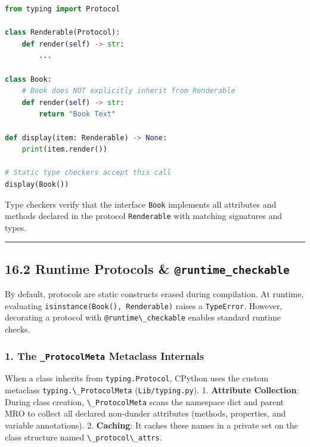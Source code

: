 \begin{lstlisting}[language=Python]
from typing import Protocol

class Renderable(Protocol):
    def render(self) -> str:
        ...

class Book:
    # Book does NOT explicitly inherit from Renderable
    def render(self) -> str:
        return "Book Text"

def display(item: Renderable) -> None:
    print(item.render())

# Static type checkers accept this call
display(Book())
\end{lstlisting}

Type checkers verify that the interface \passthrough{\lstinline!Book!}
implements all attributes and methods declared in the protocol
\passthrough{\lstinline!Renderable!} with matching signatures and types.

\begin{center}\rule{0.5\linewidth}{0.5pt}\end{center}

\hypertarget{runtime-protocols-runtime_checkable}{%
\subsection{\texorpdfstring{16.2 Runtime Protocols \&
\texttt{@runtime\_checkable}}{16.2 Runtime Protocols \& @runtime\_checkable}}\label{runtime-protocols-runtime_checkable}}

By default, protocols are static constructs erased during compilation.
At runtime, evaluating
\passthrough{\lstinline!isinstance(Book(), Renderable)!} raises a
\passthrough{\lstinline!TypeError!}. However, decorating a protocol with
\passthrough{\lstinline!@runtime\_checkable!} enables standard runtime
checks.

\hypertarget{the-_protocolmeta-metaclass-internals}{%
\subsubsection{\texorpdfstring{1. The \texttt{\_ProtocolMeta} Metaclass
Internals}{1. The \_ProtocolMeta Metaclass Internals}}\label{the-_protocolmeta-metaclass-internals}}

When a class inherits from \passthrough{\lstinline!typing.Protocol!},
CPython uses the custom metaclass
\passthrough{\lstinline!typing.\_ProtocolMeta!}
(\passthrough{\lstinline!Lib/typing.py!}). 1. \textbf{Attribute
Collection}: During class creation,
\passthrough{\lstinline!\_ProtocolMeta!} scans the namespace dict and
parent MRO to collect all declared non-dunder attributes (methods,
properties, and variable annotations). 2. \textbf{Caching}: It caches
these names in a private set on the class structure named
\passthrough{\lstinline!\_protocol\_attrs!}.

